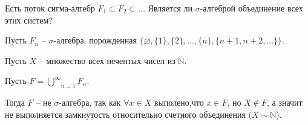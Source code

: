 \begin{task}{9}
Есть поток сигма-алгебр $F_1 \subset F_2 \subset \ldots$ Является ли $\sigma$-алгеброй объединение всех этих систем?
\end{task}
\begin{solution}
    Пусть $F_n$ -- $\sigma$-алгебра, порожденная $\{\varnothing, \{1\}, \{2\}, \ldots, \{n\}, \{n + 1, n + 2, \ldots\}\}$.
    
    Пусть $X$ -- множество всех нечентых чисел из $\mathbb{N}$.
    
    Пусть $F = \underset{n=1}{\overset{\infty}{\bigcup}} F_n$.
    
    Тогда $F$ -- не $\sigma$-алгебра, так как $\forall x \in X$ выполено,что $x \in F$, но $X \notin F$, а значит не выполняется замкнутость относительно счетного объединения ($X \sim \mathbb{N}$).
\end{solution}